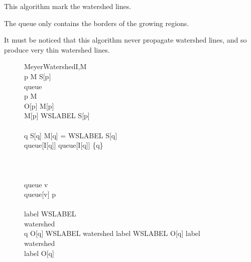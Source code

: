 \documentclass{InsightArticle}
\begin{document}
This algorithm mark the watershed lines.

The queue only contains the borders of the growing regions.

It must be noticed that this algorithm never propagate watershed
lines, and so produce very thin watershed lines.

\begin{figure}[htbp]
\centering
\small
\begin{pseudocode}[framebox]{MeyerWatershed}{I,M}
 \\
\FOREACH p \in M \DO
  S[p] \GETS \FALSE \\
queue \GETS \emptyset \\
\FOREACH p \in M \DO
\BEGIN
  \\
  O[p] \GETS M[p] \\
  \IF M[p] \neq WSLABEL
  \THEN
  \BEGIN
    S[p] \GETS \TRUE \\
    \\
    \FOREACH q \in {} \DO
    \BEGIN
      \IF \neg S[q] \AND M[q] = WSLABEL 
      \THEN
      \BEGIN
        S[q] \GETS \TRUE \\
        queue[I[q]] \GETS queue[I[q]] \cup \{q\} \\
      \END
    \END
  \END
\END
\\
\\
 \\
\WHILE queue \neq \emptyset \DO
\BEGIN
  v \GETS {}\\
  \WHILE queue[v] \neq \emptyset \DO
  \BEGIN
    p \GETS {} \\
     \\
    label \GETS WSLABEL \\
    watershed \GETS \FALSE \\
    \FOREACH q \in {} \DO
    \BEGIN
      \IF O[q] \neq WSLABEL \AND \neg watershed
      \THEN
        \BEGIN
        \IF label \neq WSLABEL \AND O[q] \neq label \\
        \THEN
          watershed \GETS \TRUE \\
        \ELSE
          label \GETS O[q] \\
        \END
    \END \\
     \\

\end{pseudocode}
\end{figure}
\end{document}
